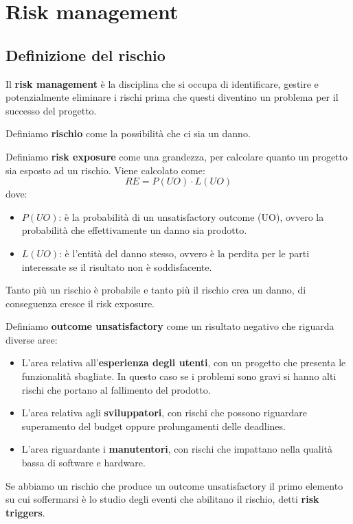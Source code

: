 \chapter{Risk management}
\section{Definizione del rischio}
\begin{definizione}
    Il \textbf{risk management} è la disciplina che si occupa di identificare,
    gestire e potenzialmente eliminare i rischi prima che questi diventino un
    problema per il successo del progetto.
\end{definizione}
\begin{definizione}
    Definiamo \textbf{rischio} come la possibilità che ci sia un danno.
\end{definizione}
\begin{definizione}
    Definiamo \textbf{risk exposure} come una grandezza, per calcolare quanto
    un progetto sia esposto ad un rischio. Viene calcolato come:
    \begin{equation}
        RE = P(UO) \cdot L(UO)
    \end{equation}
    dove:
    \begin{itemize}
        \item $P(UO)$: è la probabilità di un unsatisfactory outcome (UO), ovvero
              la probabilità che effettivamente un danno sia prodotto.
        \item $L(UO)$: è l'entità del danno stesso, ovvero è la perdita per le
              parti interessate se il risultato non è soddisfacente.
    \end{itemize}
    Tanto più un rischio è probabile e tanto più il rischio crea un danno, di
    conseguenza cresce il risk exposure.
\end{definizione}
\begin{definizione}
    Definiamo \textbf{outcome unsatisfactory} come un risultato negativo che
    riguarda diverse aree:
    \begin{itemize}
        \item L'area relativa all'\textbf{esperienza degli utenti}, con un progetto che
              presenta le funzionalità sbagliate. In questo caso se i problemi sono
              gravi si hanno alti rischi che portano al fallimento del prodotto.
        \item L'area relativa agli \textbf{sviluppatori}, con rischi che possono riguardare
              superamento del budget oppure prolungamenti delle deadlines.
        \item L'area riguardante i \textbf{manutentori}, con rischi che impattano nella
              qualità bassa di software e hardware.
    \end{itemize}
\end{definizione}
Se abbiamo un rischio che produce un outcome unsatisfactory il primo elemento su
cui soffermarsi è lo studio degli eventi che abilitano il rischio, detti
\textbf{risk triggers}.


